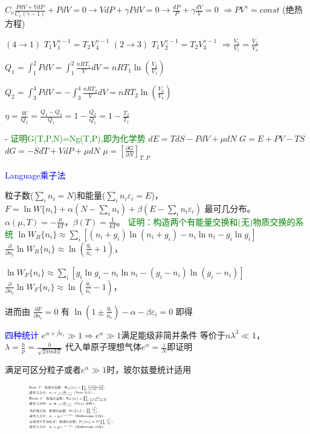 \documentclass[a4paper,8pt]{extarticle} %
\newcommand{\bluetext}[1]{\textcolor{blue}{#1}}
\newcommand{\greentext}[1]{\textcolor{green}{#1}}
\begin{document}
\begin{multicols}{3}
$C_v \frac{PdV + VdP}{C_v(\gamma-1)} + PdV = 0 \rightarrow VdP + \gamma PdV = 0 \rightarrow \frac{dP}{P} + \gamma \frac{dV}{V} = 0$
$\Rightarrow PV^\gamma = const$ (绝热方程)

$(4 \rightarrow 1)$ $T_1V_1^{\gamma-1} = T_2V_4^{\gamma-1}$
$(2 \rightarrow 3)$ $T_1V_2^{\gamma-1} = T_2V_3^{\gamma-1}$
$\Rightarrow \frac{V_2}{V_1} = \frac{V_3}{V_4}$

$Q_1 = \int_1^2 PdV = \int_1^2 \frac{nRT_1}{V}dV = nRT_1 \ln(\frac{V_2}{V_1})$

$Q_2 = \int_3^4 PdV = -\int_3^4 \frac{nRT_2}{V}dV = nRT_2 \ln(\frac{V_3}{V_4})$

$\eta = \frac{W}{Q_1} = \frac{Q_1-Q_2}{Q_1} = 1-\frac{Q_2}{Q_1} = 1-\frac{T_2}{T_1}$

- \greentext{证明G(T,P,N)=Ng(T,P),即为化学势}
$dE = TdS - PdV + \mu dN$
$G = E + PV - TS$
$dG = -SdT + VdP + \mu dN$
$\mu = \left[\frac{\partial G}{\partial N}\right]_{T,P}$

\bluetext{Language乘子法}

粒子数($\sum_i n_i = N$)和能量($\sum_i n_i\varepsilon_i = E$)，$F = \ln W\{n_i\} + \alpha(N-\sum_i n_i) + \beta(E-\sum_i n_i\varepsilon_i)$ 最可几分布。$\alpha(\mu,T) = -\frac{\mu}{kT}$，$\beta(T) = \frac{1}{kT}$。
\greentext{证明：构造两个有能量交换和(无)物质交换的系统}
$\ln W_B\{n_i\} \approx \sum_i [(n_i + g_i)\ln(n_i + g_i) - n_i \ln n_i - g_i \ln g_i]$
$\frac{\partial}{\partial n_i}\ln W_B\{n_i\} \approx \ln(\frac{g_i}{n_i} + 1)$，

$\ln W_F\{n_i\} \approx \sum_i [g_i \ln g_i - n_i \ln n_i - (g_i - n_i)\ln(g_i - n_i)]$
$\frac{\partial}{\partial n_i}\ln W_F\{n_i\} \approx \ln(\frac{g_i}{n_i} - 1)$，

进而由 $\frac{\partial F}{\partial n_i} = 0$ 有 $\ln(1 \pm \frac{g_i}{n_i}) - \alpha - \beta\varepsilon_i = 0$ 即得

\bluetext{四种统计}
$e^{\alpha+\beta\varepsilon_i} \gg 1 \Rightarrow e^\alpha \gg 1$满足能级非简并条件
等价于$n\lambda^3 \ll 1$，$\lambda = \frac{h}{p} = \frac{h}{\sqrt{2\pi mkT}}$
代入单原子理想气体$e^\alpha = \frac{z}{N}$即证明

满足可区分粒子或者$e^\alpha \gg 1$时，玻尔兹曼统计适用

\begin{figure}[H]
    \vspace{-0.3cm}
    \centering
    \includegraphics[width=0.33\textwidth]{images/1.png}
    \vspace{-0.6cm}
\end{figure}


\end{multicols}
\end{document}
